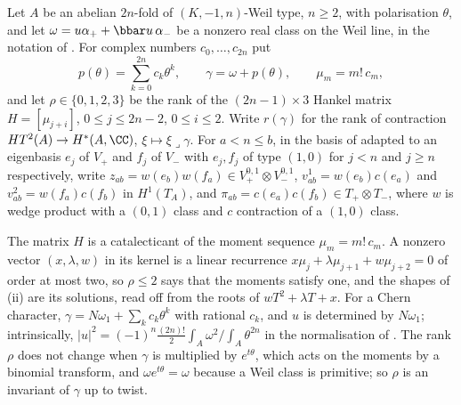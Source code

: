 \begin{setupenv}\label{setup:p2prime}
Let $A$ be an abelian $2n$-fold of $(K,-1,n)$-Weil type, $n\ge2$, with
polarisation $\theta$, and let $\omega=u\alpha_{+}+\bbar u\,\alpha_{-}$ be a
nonzero real class on the Weil line, in the notation of .
For complex numbers $c_{0},\dots,c_{2n}$ put
\[
  p(\theta)=\sum_{k=0}^{2n}c_{k}\theta^{k},\qquad
  \gamma=\omega+p(\theta),\qquad \mu_{m}=m!\,c_{m},
\]
and let $\rho\in\{0,1,2,3\}$ be the rank of the $(2n-1)\times3$ Hankel matrix
$H=[\mu_{j+i}]$, $0\le j\le2n-2$, $0\le i\le2$. Write $r(\gamma)$ for the
rank of contraction $HT^{2}(A)\to H^{*}(A,\CC)$, $\xi\mapsto\xi\lrcorner\gamma$.
For $a<n\le b$, in the basis of  adapted to an
eigenbasis $e_{j}$ of $V_{+}$ and $f_{j}$ of $V_{-}$ with $e_{j},f_{j}$ of
type $(1,0)$ for $j<n$ and $j\ge n$ respectively, write
$z_{ab}=w(e_{b})w(f_{a})\in V_{+}^{0,1}\otimes V_{-}^{0,1}$,
$v^{1}_{ab}=w(e_{b})c(e_{a})$ and $v^{2}_{ab}=w(f_{a})c(f_{b})$ in
$H^{1}(T_{A})$, and $\pi_{ab}=c(e_{a})c(f_{b})\in T_{+}\otimes T_{-}$, where
$w$ is wedge product with a $(0,1)$ class and $c$ contraction of a $(1,0)$
class.
\end{setupenv}

The matrix $H$ is a catalecticant of the moment sequence
$\mu_{m}=m!\,c_{m}$. A nonzero vector $(x,\lambda,w)$ in its kernel is a
linear recurrence $x\mu_{j}+\lambda\mu_{j+1}+w\mu_{j+2}=0$ of order at most
two, so $\rho\le2$ says that the moments satisfy one, and the shapes of
(ii) are its solutions, read off from the roots of
$wT^{2}+\lambda T+x$. For a Chern character,
$\gamma=N\omega_{1}+\sum_{k}c_{k}\theta^{k}$ with rational $c_{k}$, and $u$
is determined by $N\omega_{1}$; intrinsically,
$|u|^{2}=(-1)^{n}\tfrac{(2n)!}{2}\int_{A}\omega^{2}\big/\!\int_{A}\theta^{2n}$
in the normalisation of \cite{BMB26}. The rank
$\rho$ does not change when
$\gamma$ is multiplied by $e^{t\theta}$, which acts on the moments by a
binomial transform, and $\omega e^{t\theta}=\omega$ because a Weil class is
primitive; so $\rho$ is an invariant of $\gamma$ up to twist.

